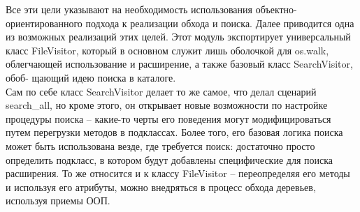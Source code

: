 \documentclass[12pt]{article}
\begin{document}
Все эти цели указывают на необходимость использования объектно-ориентированного подхода к реализации обхода
и поиска. Далее приводится одна из возможных реализаций
этих целей. Этот модуль экспортирует универсальный класс FileVisitor,
который в основном служит лишь оболочкой для os.walk, облегчающей
использование и расширение, а также базовый класс SearchVisitor, обоб-
щающий идею поиска в каталоге.\\
Сам по себе класс SearchVisitor делает то же самое, что делал сценарий
search\_all, но кроме этого, он открывает новые возможности по настройке процедуры поиска – какие-то черты его поведения могут модифицироваться путем перегрузки методов в подклассах. Более того,
его базовая логика поиска может быть использована везде, где требуется поиск: достаточно просто определить подкласс, в котором будут
добавлены специфические для поиска расширения. То же относится
и к классу FileVisitor – переопределяя его методы и используя его атрибуты, можно внедряться в процесс обхода деревьев, используя приемы
ООП.
\end{document}
